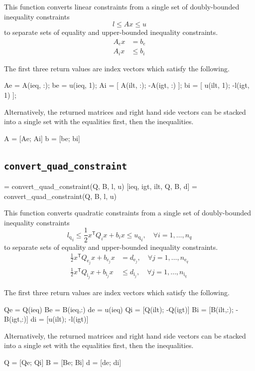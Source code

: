 \documentclass[12pt]{article}
\newcommand{\trans}[1]{{#1}^{\ensuremath{\mathsf{T}}}}  %
\newcommand{\llqi}{{l_\textrm{q}}_i}
\newcommand{\uuqi}{{u_\textrm{q}}_i}
\numberwithin{equation}{section}
\numberwithin{table}{section}
\numberwithin{figure}{section}
\begin{document}
This function converts linear constraints from a single set of doubly-bounded inequality constraints
\begin{equation}
l \le A x \le u
\end{equation}
to separate sets of equality and upper-bounded inequality constraints.
\begin{align}
A_e x &= b_e \\
A_i x &\le b_i
\end{align}

The first three return values are index vectors which satisfy the following.
\begin{Code}
Ae = A(ieq, :);
be = u(ieq, 1);
Ai  = [ A(ilt, :); -A(igt, :) ];
bi  = [ u(ilt, 1); -l(igt, 1) ];
\end{Code}
Alternatively, the returned matrices and right hand side vectors can be stacked into a single set with the equalities first, then the inequalities.
\begin{Code}
A = [Ae; Ai]
b = [be; bi]
\end{Code}

\subsection{\tt convert\_quad\_constraint}
\begin{Code}
   = convert_quad_constraint(Q, B, l, u)
  [ieq, igt, ilt, Q, B, d] = convert_quad_constraint(Q, B, l, u)
\end{Code}

This function converts quadratic constraints from a single set of doubly-bounded inequality constraints
\begin{equation}
\llqi \le \frac{1}{2} \trans{x} Q_i x + b_i x \le \uuqi, \quad \forall i = 1, \dots, n_q
\end{equation}
to separate sets of equality and upper-bounded inequality constraints.
\begin{align}
\frac{1}{2} \trans{x} Q_{\textrm{e}_j} x + b_{\textrm{e}_j} x &= d_{\textrm{e}_j}, \quad \forall j = 1, \dots, n_{\textrm{e}_q} \\
\frac{1}{2} \trans{x} Q_{\textrm{i}_j} x + b_{\textrm{i}_j} x &\le d_{\textrm{i}_j}, \quad \forall j = 1, \dots, n_{\textrm{i}_q}
\end{align}

The first three return values are index vectors which satisfy the following.
\begin{Code}
Qe = Q(ieq)
Be = B(ieq,:)
de = u(ieq)
Qi = [Q(ilt); -Q(igt)]
Bi = [B(ilt,:); -B(igt,:)]
di = [u(ilt);  -l(igt)]\end{Code}
Alternatively, the returned matrices and right hand side vectors can be stacked into a single set with the equalities first, then the inequalities.
\begin{Code}
Q = [Qe; Qi]
B = [Be; Bi]
d = [de; di]
\end{Code}
\end{document}
